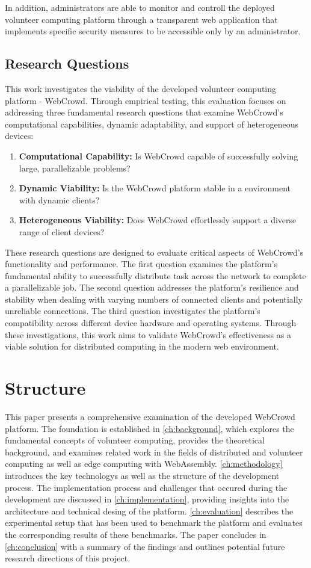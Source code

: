 In addition, administrators are able to monitor and controll the deployed volunteer computing platform through a transparent web application that implements specific security measures to be accessible only by an administrator.

\subsection{Research Questions}
\label{subsec:into:objectives:questions}
This work investigates the viability of the developed volunteer computing platform - WebCrowd. Through empirical testing, this evaluation focuses on addressing three fundamental research questions that examine WebCrowd's computational capabilities, dynamic adaptability, and support of heterogeneous devices:
\begin{enumerate}
    \item \textbf{Computational Capability:} Is WebCrowd capable of successfully solving large, parallelizable problems?
    \item \textbf{Dynamic Viability:} Is the WebCrowd platform stable in a environment with dynamic clients?
    \item \textbf{Heterogeneous Viability:} Does WebCrowd effortlessly support a diverse range of client devices?
\end{enumerate}
These research questions are designed to evaluate critical aspects of WebCrowd's functionality and performance. The first question examines the platform's fundamental ability to successfully distribute task across the network to complete a parallelizable job. The second question addresses the platform's resilience and stability when dealing with varying numbers of connected clients and potentially unreliable connections. The third question investigates the platform's compatibility across different device hardware and operating systems. Through these investigations, this work aims to validate WebCrowd's effectiveness as a viable solution for distributed computing in the modern web environment.

\section{Structure}
\label{sec:intro:structure}
This paper presents a comprehensive examination of the developed WebCrowd platform. The foundation is established in \autoref{ch:background}, which explores the fundamental concepts of volunteer computing, provides the theoretical background, and examines related work in the fields of distributed and volunteer computing as well as edge computing with WebAssembly. \autoref{ch:methodology} introduces the key technologys as well as the structure of the development process. The implementation process and challenges that occured during the development are discussed in \autoref{ch:implementation}, providing insights into the architecture and technical desing of the platform. \autoref{ch:evaluation} describes the experimental setup that has been used to benchmark the platform and evaluates the corresponding results of these benchmarks. The paper concludes in \autoref{ch:conclusion} with a summary of the findings and outlines potential future research directions of this project.

